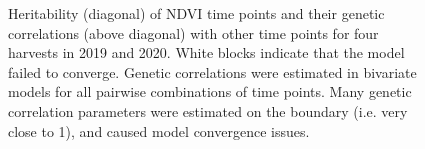\documentclass[12pt, letterpaper]{article}
\begin{document}
\begin{figure}
\caption{Heritability (diagonal) of NDVI time points and their genetic correlations (above diagonal) with other time points for four harvests in 2019 and 2020. White blocks indicate that the model failed to converge. Genetic correlations were estimated in  bivariate models for all pairwise combinations of time points.  Many genetic correlation parameters were estimated on the boundary (i.e. very close to 1), and caused model convergence issues.}
\label{genCorVI}
\end{figure}
\end{document}
